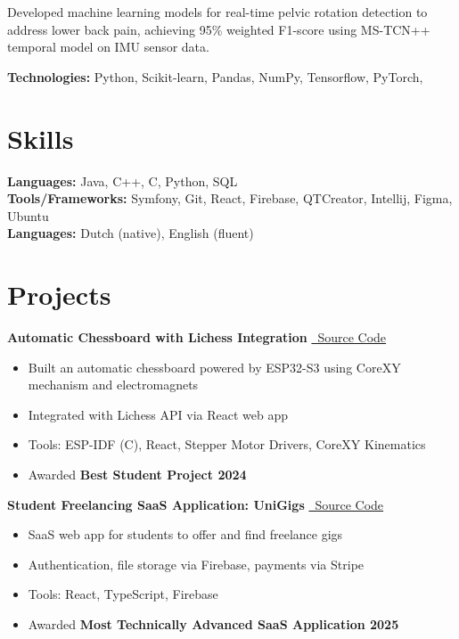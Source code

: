 \documentclass[10pt,a4paper]{article}
\newenvironment{highlights}{\begin{itemize}}{\end{itemize}}
\begin{document}
    \vspace{.2cm}
    Developed machine learning models for real-time pelvic rotation detection to address lower back pain, achieving 95\% weighted F1-score using MS-TCN++ temporal model on IMU sensor data.

    \textbf{Technologies:} Python, Scikit-learn, Pandas, NumPy, Tensorflow, PyTorch,

    \section{Skills}
    \textbf{Languages:} Java, C++, C, Python, SQL \\
    \textbf{Tools/Frameworks:} Symfony, Git, React, Firebase, QTCreator, Intellij, Figma, Ubuntu \\
    \textbf{Languages:} Dutch (native), English (fluent)

    \section{Projects}

    \textbf{Automatic Chessboard with Lichess Integration} \hfill \href{https://github.com/Yornared/ESP32_Chessboard_code}{\faGithub\ Source Code}
    \begin{highlights}
        \item Built an automatic chessboard powered by ESP32-S3 using CoreXY mechanism and electromagnets
        \item Integrated with Lichess API via React web app
        \item Tools: ESP-IDF (C), React, Stepper Motor Drivers, CoreXY Kinematics
        \item Awarded \textbf{Best Student Project 2024}
    \end{highlights}

    \vspace{0.3cm}

    \textbf{Student Freelancing SaaS Application: UniGigs} \hfill \href{https://github.com/Yornared/FreelanceApp}{\faGithub\ Source Code}
    \begin{highlights}
        \item SaaS web app for students to offer and find freelance gigs
        \item Authentication, file storage via Firebase, payments via Stripe
        \item Tools: React, TypeScript, Firebase
        \item Awarded \textbf{Most Technically Advanced SaaS Application 2025}
    \end{highlights}
\end{document}
